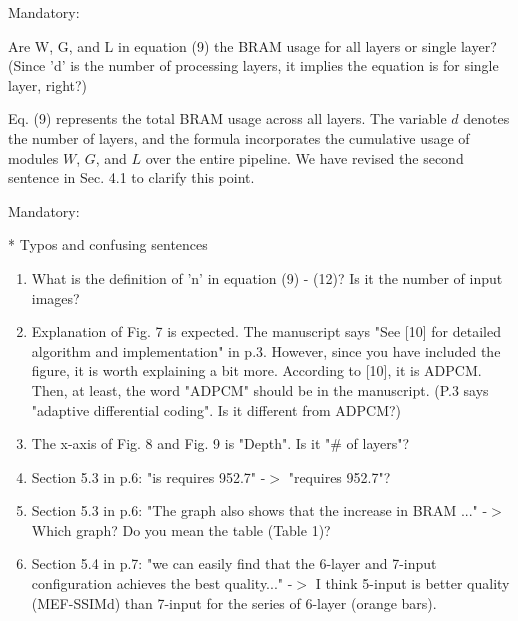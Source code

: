 \documentclass[a4j]{jsarticle}
\begin{document}
\vspace{0.3cm}
\begin{screen}
Mandatory:

Are W, G, and L in equation (9) the BRAM usage for all layers or single layer? (Since 'd' is the number of processing layers, it implies the equation is for single layer, right?)
\end{screen}
Eq. (9) represents the total BRAM usage across all layers. 
The variable $d$ denotes the number of layers, and the formula incorporates 
the cumulative usage of modules $W$, $G$, and $L$ over the entire pipeline.
We have revised the second sentence in Sec. 4.1 to clarify this point. 

\vspace{0.3cm}
\begin{screen}
Mandatory:

* Typos and confusing sentences
\begin{enumerate}
\item What is the definition of 'n' in equation (9) - (12)? Is it the number of input images?

\item Explanation of Fig. 7 is expected. The manuscript says "See [10] for detailed algorithm and implementation" in p.3. However, since you have included the figure, it is worth explaining a bit more.
According to [10], it is ADPCM. Then, at least, the word "ADPCM" should be in the manuscript. (P.3 says "adaptive differential coding". Is it different from ADPCM?)

\item The x-axis of Fig. 8 and Fig. 9 is "Depth". Is it "\# of layers"?

\item Section 5.3 in p.6: "is requires 952.7" -$>$ "requires 952.7"?

\item Section 5.3 in p.6: "The graph also shows that the increase in BRAM ..." -$>$ Which graph? Do you mean the table (Table 1)?

\item Section 5.4 in p.7: "we can easily find that the 6-layer and 7-input configuration achieves the best quality..."
-$>$ I think 5-input is better quality (MEF-SSIMd) than 7-input for the series of 6-layer (orange bars).

\end{enumerate}
\end{screen}
\end{document}
